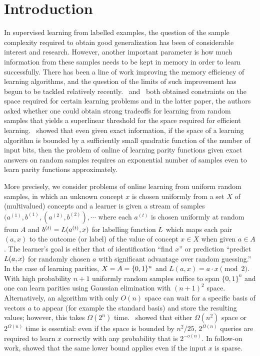 \section{Introduction}

In supervised learning from labelled examples, the question of the sample complexity required to obtain good generalization has been of considerable interest and research.   However, another
important parameter is how much information from these samples needs to be
kept in memory in order to learn successfully.
There has been a line of work improving the memory efficiency of
learning algorithms, and the question of the limits of such improvement has
begun to be tackled relatively recently.
\cite{DBLP:conf/nips/Shamir14}~and 
\cite{DBLP:conf/colt/SteinhardtVW16}~both
obtained constraints on the space required for certain learning problems and
in the latter paper, the authors  asked whether one could obtain strong
tradeoffs for learning from random samples that yields a superlinear threshold
for the space required for efficient learning.
\cite{DBLP:conf/focs/Raz16}~showed that
even given exact information, if the space of a learning algorithm is
bounded by a sufficiently small quadratic function of the number of input bits, then the
problem of online of learning parity functions given exact answers on random samples requires an
exponential number of samples even to learn parity functions approximately.

\begin{sloppypar}
More precisely, we consider problems of online learning from uniform random samples, in which an
unknown concept $x$ is chosen uniformly from a set $X$ of (multivalued) concepts and a learner is given a stream of samples 
$(a^{(1)},b^{(1)},(a^{(2)},b^{(2)}),\cdots$ where each $a^{(t)}$ is chosen
uniformly at random from $A$ and $b^{(t)}=L(a^{(t)},x)$ for labelling
function $L$ which maps
each pair $(a,x)$ to the outcome (or label) of the value of concept $x\in X$ when
given $a\in A$.  
The learner's goal is either that of identification ``find $x$'' or prediction ``predict $L(a,x)$ for randomly chosen $a$ with significant advantage over random
guessing.'' 
In the case of learning parities, $X=A=\{0,1\}^n$ and $L(a,x)=a\cdot x\pmod 2$.
With high probability $n+1$ uniformly random samples suffice to span
$\{0,1\}^n$ and one can learn parities using
Gaussian elimination with $(n+1)^2$ space.
Alternatively, an algorithm with only $O(n)$ space can wait for a specific
basis of vectors $a$ to appear (for example the standard basis) and store the 
resulting values; however, this takes $\Omega(2^n)$ time.
\cite{DBLP:conf/focs/Raz16}~showed that either $\Omega(n^2)$ space 
or $2^{\Omega(n)}$ time is essential: even if the space is bounded by $n^2/25$,
$2^{\Omega(n)}$ queries are required to learn $x$ correctly with any
probability that is $2^{-o(n)}$.
In follow-on work, \cite{DBLP:conf/stoc/KolRT17} showed that the same
lower bound applies even if the input $x$ is sparse.
\end{sloppypar}

